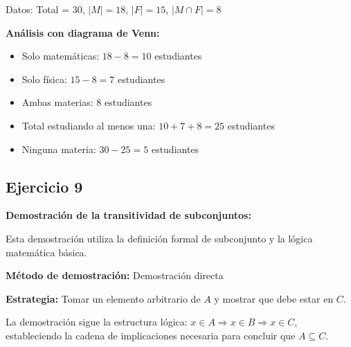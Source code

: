 Datos: Total = 30, $|M| = 18$, $|F| = 15$, $|M \cap F| = 8$

\textbf{Análisis con diagrama de Venn:}
\begin{itemize}
    \item Solo matemáticas: $18 - 8 = 10$ estudiantes
    \item Solo física: $15 - 8 = 7$ estudiantes  
    \item Ambas materias: $8$ estudiantes
    \item Total estudiando al menos una: $10 + 7 + 8 = 25$ estudiantes
    \item Ninguna materia: $30 - 25 = 5$ estudiantes
\end{itemize}

\subsection*{Ejercicio 9}

\textbf{Demostración de la transitividad de subconjuntos:}

Esta demostración utiliza la definición formal de subconjunto y la lógica matemática básica.

\textbf{Método de demostración:} Demostración directa

\textbf{Estrategia:} Tomar un elemento arbitrario de $A$ y mostrar que debe estar en $C$.

La demostración sigue la estructura lógica: $x \in A \Rightarrow x \in B \Rightarrow x \in C$, estableciendo la cadena de implicaciones necesaria para concluir que $A \subseteq C$.